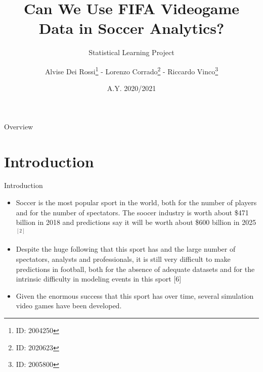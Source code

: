 \documentclass[aspectratio=169,xcolor=dvipsnames]{beamer}
\title[short title]{Can We Use FIFA Videogame Data in Soccer Analytics?}
\subtitle{Statistical Learning Project}
\author {Alvise Dei Rossi\footnote{ID: 2004250} - Lorenzo Corrado\footnote{ID: 2020623} - Riccardo Vinco\footnote{ID: 2005800}}
\institute[UNIPD] %
{
    Department of Mathematics "Tullio Levi-Civita" \\
    MS in Data Science \\
    University of Padua
    \vskip 3pt
}
\date{A.Y. 2020/2021} %
\begin{document}

\begin{frame}
    \titlepage
\end{frame}

\begin{frame}{Overview}
    \tableofcontents
\end{frame}


\section{Introduction}

\begin{frame}{Introduction}
\begin{itemize}
    \item Soccer is the most popular sport in the world, both for the number of players and for the number of spectators. The soocer industry is worth about \$471 billion in 2018 and predictions say it will be worth about \$600 billion in 2025$^{[2]}$
    \item Despite the huge following that this sport has and the large number of spectators, analysts and professionals, it is still very difficult to make predictions in football, both for the absence of adequate datasets and for the intrinsic difficulty in modeling events in this sport [6]
    
    \item Given the enormous success that this sport has over time, several simulation video games have been developed.
\end{itemize}
\end{frame}

\end{document}
